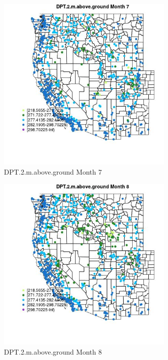 \begin{figure} 
\centering  
\includegraphics[width=0.77\textwidth]{Code_Outputs/Report_ML_input_PM25_Step4_part_e_de_duplicated_aves_compiled_2019-05-21wNAs_MapObsMo7DPT2maboveground.jpg} 
\caption{\label{fig:Report_ML_input_PM25_Step4_part_e_de_duplicated_aves_compiled_2019-05-21wNAsMapObsMo7DPT2maboveground}DPT.2.m.above.ground Month 7} 
\end{figure} 
 

\begin{figure} 
\centering  
\includegraphics[width=0.77\textwidth]{Code_Outputs/Report_ML_input_PM25_Step4_part_e_de_duplicated_aves_compiled_2019-05-21wNAs_MapObsMo8DPT2maboveground.jpg} 
\caption{\label{fig:Report_ML_input_PM25_Step4_part_e_de_duplicated_aves_compiled_2019-05-21wNAsMapObsMo8DPT2maboveground}DPT.2.m.above.ground Month 8} 
\end{figure} 
 

